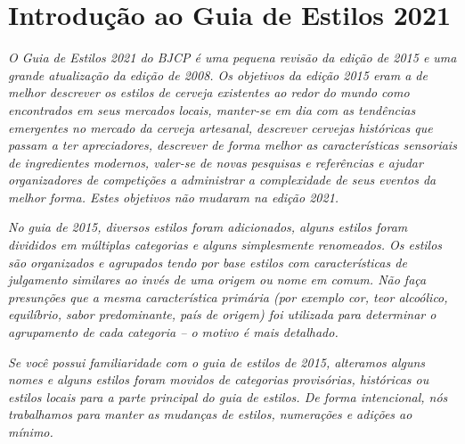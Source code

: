 \section*{Introdução ao Guia de Estilos 2021}
\textit{O Guia de Estilos 2021 do BJCP é uma pequena revisão da edição de 2015 e uma grande atualização da edição de 2008. Os objetivos da edição 2015 eram a de melhor descrever os estilos de cerveja existentes ao redor do mundo como encontrados em seus mercados locais, manter-se em dia com as tendências emergentes no mercado da cerveja artesanal, descrever cervejas históricas que passam a ter apreciadores, descrever de forma melhor as características sensoriais de ingredientes modernos, valer-se de novas pesquisas e referências e ajudar organizadores de competições a administrar a complexidade de seus eventos da melhor forma. Estes objetivos não mudaram na edição 2021.}

\textit{No guia de 2015, diversos estilos foram adicionados, alguns estilos foram divididos em múltiplas categorias e alguns simplesmente renomeados. Os estilos são organizados e agrupados tendo por base estilos com características de julgamento similares ao invés de uma origem ou nome em comum. Não faça presunções que a mesma característica primária (por exemplo cor, teor alcoólico, equilíbrio, sabor predominante, país de origem) foi utilizada para determinar o agrupamento de cada categoria – o motivo é mais detalhado.}

\textit{Se você possui familiaridade com o guia de estilos de 2015, alteramos alguns nomes e alguns estilos foram movidos de categorias provisórias, históricas ou estilos locais para a parte principal do guia de estilos. De forma intencional, nós trabalhamos para manter as mudanças de estilos, numerações e adições ao mínimo.}
